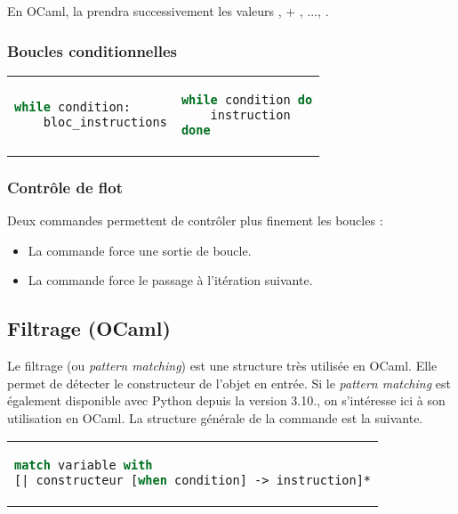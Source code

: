 \documentclass{hibiscus}
\begin{document}
\medskip \par En OCaml, la  prendra successivement les valeurs ,  + , ..., .

\subsubsection{Boucles conditionnelles}

\begin{tabular}{p{} p{}}
\begin{lstlisting}[language=Python]
while condition:
    bloc_instructions
\end{lstlisting}
&
\begin{lstlisting}[language=Caml]
while condition do
    instruction
done
\end{lstlisting}
\end{tabular}

\subsubsection{Contrôle de flot}

\par Deux commandes permettent de contrôler plus finement les boucles :
\medskip
\begin{itemize}
\item La commande  force une sortie de boucle.
\item La commande  force le passage à l'itération suivante.
\end{itemize}

\subsection{Filtrage (OCaml)}

\par Le filtrage (ou \textit{pattern matching}) est une structure très utilisée en OCaml. Elle permet de détecter le constructeur de l'objet en entrée. Si le \textit{pattern matching} est également disponible avec Python depuis la version 3.10., on s'intéresse ici à son utilisation en OCaml. La structure générale de la commande est la suivante.

\medskip \begin{tabular}{l}
\begin{lstlisting}[language=Caml]
match variable with
[| constructeur [when condition] -> instruction]*
\end{lstlisting}
\end{tabular}
\end{document}
